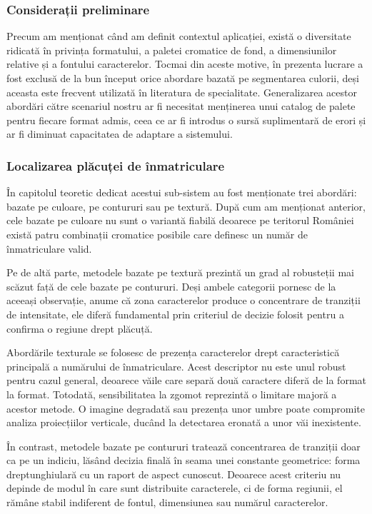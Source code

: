 \subsubsection{Considerații preliminare}
\indent\par
Precum am menționat când am definit contextul aplicației, există o diversitate ridicată în privința formatului, a paletei cromatice de fond, a dimensiunilor relative și a fontului caracterelor. Tocmai din aceste motive, în prezenta lucrare a fost exclusă de la bun început orice abordare bazată pe segmentarea culorii, deși aceasta este frecvent utilizată în literatura de specialitate. Generalizarea acestor abordări către scenariul nostru ar fi necesitat menținerea unui catalog de palete pentru fiecare format admis, ceea ce ar fi introdus o sursă suplimentară de erori și ar fi diminuat capacitatea de adaptare a sistemului.

\subsubsection{Localizarea plăcuței de înmatriculare}
\indent\par
În capitolul teoretic dedicat acestui sub-sistem au fost menționate trei abordări: bazate pe culoare, pe contururi sau pe textură. După cum am menționat anterior, cele bazate pe culoare nu sunt o variantă fiabilă deoarece pe teritorul României există patru combinații cromatice posibile care definesc un număr de înmatriculare valid.

Pe de altă parte, metodele bazate pe textură prezintă un grad al robusteții mai scăzut față de cele bazate pe contururi. Deși ambele categorii pornesc de la aceeași observație, anume că zona caracterelor produce o concentrare de tranziții de intensitate, ele diferă fundamental prin criteriul de decizie folosit pentru a confirma o regiune drept plăcuță.

Abordările texturale se folosesc de prezența caracterelor drept caracteristică principală a numărului de înmatriculare. Acest descriptor nu este unul robust pentru cazul general, deoarece văile care separă două caractere diferă de la format la format. Totodată, sensibilitatea la zgomot reprezintă o limitare majoră a acestor metode. O imagine degradată sau prezența unor umbre poate compromite analiza proiecțiilor verticale, ducând la detectarea eronată a unor văi inexistente.

În contrast, metodele bazate pe contururi tratează concentrarea de tranziții doar ca pe un indiciu, lăsând decizia finală în seama unei constante geometrice: forma dreptunghiulară cu un raport de aspect cunoscut. Deoarece acest criteriu nu depinde de modul în care sunt distribuite caracterele, ci de forma regiunii, el rămâne stabil indiferent de fontul, dimensiunea sau numărul caracterelor.

